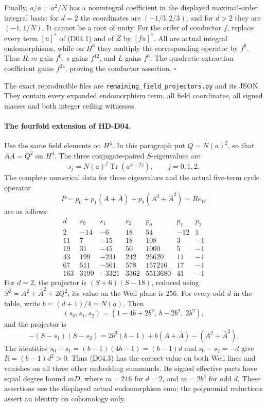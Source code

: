 Finally, \(a/\bar a=a^2/N\) has a nonintegral coefficient in
the displayed maximal-order integral basis: for \(d=2\) the
coordinates are \((-1/3,2/3)\), and for \(d>2\) they are
\((-1,1/N)\). It cannot be a root of unity.
For the order of conductor \(f\), replace every term
\([u]^*\) of (D04.1) and of \(Z\) by \([fu]^*\).
All are actual integral endomorphisms, while on \(H^6\)
they multiply the corresponding operator by \(f^6\).
Thus \(R,m\) gain \(f^6\), \(s\) gains \(f^{12}\), and
\(L\) gains \(f^6\). The quadratic extraction coefficient
gains \(f^{24}\), proving the conductor assertion.
\(\square\)

The exact reproducible files are
\texttt{remaining\_field\_projectors.py} and its JSON.
They contain every expanded endomorphism term, all field
coordinates, all signed masses and both integer ceiling witnesses.

\paragraph{The fourfold extension of HD-D04.}
Use the same field elements on \(H^4\).  In this paragraph put
\(Q=N(a)^2\), so that \(A\bar A=Q^2\) on \(H^4\).
The three conjugate-paired \(S\)-eigenvalues are
\[
 s_j=N(a)^j\operatorname{Tr}(a^{4-2j}),\qquad j=0,1,2.
\]
The complete numerical data for these eigenvalues and the actual
five-term cycle operator
\[
 P=p_0+p_1(A+\bar A)+p_2(A^2+\bar A^2)=R e_W
                                                               \tag{D04.3}
\]
are as follows:
\[
\begin{array}{c|r|r|r|r|r|r}
d&s_0&s_1&s_2&p_0&p_1&p_2\\\hline
2&-14&-6&18&54&-12&1\\
11&7&-15&18&108&3&-1\\
19&31&-45&50&1000&5&-1\\
43&199&-231&242&26620&11&-1\\
67&511&-561&578&157216&17&-1\\
163&3199&-3321&3362&5513680&41&-1
\end{array}
\]
For \(d=2\), the projector is \((S+6)(S-18)\), reduced using
\(S^2=A^2+\bar A^2+2Q^2\); its value on the Weil plane is
\(256\).  For every odd \(d\) in the table, write
\(b=(d+1)/4=N(a)\).  Then
\[
 (s_0,s_1,s_2)=(1-4b+2b^2,\ b-2b^2,\ 2b^2),
\]
and the projector is
\[
 -(S-s_1)(S-s_2)
 =2b^3(b-1)+b(A+\bar A)-(A^2+\bar A^2).
\]
The identities
\(s_0-s_1=(b-1)(4b-1)=(b-1)d\) and
\(s_0-s_2=-d\) give \(R=(b-1)d^2>0\).
Thus (D04.3) has the correct value on both Weil lines and vanishes
on all three other embedding summands.  Its signed effective parts
have equal degree bound \(mD\), where \(m=216\) for \(d=2\),
and \(m=2b^4\) for odd \(d\).  These assertions use the displayed
actual endomorphism sum; the polynomial reductions assert an
identity on cohomology only.

